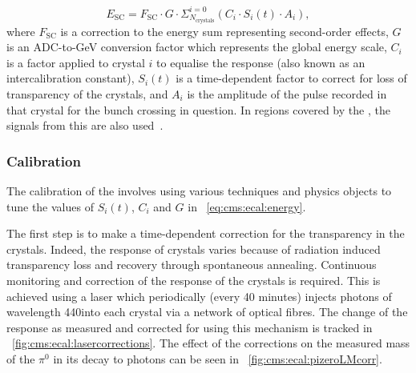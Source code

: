 \begin{equation} 
\label{eq:cms:ecal:energy}
E_{\text{SC}} = F_{\text{SC}} \cdot G \cdot \Sigma^{i=0}_{N_\text{crystals}} ( C_{i} \cdot S_{i}(t) \cdot A_{i}) ,
\end{equation}
where $F_{\text{SC}}$ is a correction to the \SC energy sum representing second-order effects, $G$ is an ADC-to-GeV conversion factor which represents the global energy scale, $C_{i}$ is a factor applied to crystal $i$ to equalise the response (also known as an intercalibration constant), $S_{i}(t)$ is a time-dependent factor to correct for loss of transparency of the crystals, and $A_{i}$ is the amplitude of the pulse recorded in that crystal for the bunch crossing in question. In regions covered by the \ES, the signals from this \subdetector are also used~\cite{cmsEcalCalibration}.


\subsubsection{Calibration}
\label{sec:cms:ecal:calibration}

The calibration of the \ECAL involves using various techniques and physics objects to tune the values of $S_{i}(t)$, $C_{i}$ and $G$ in \Eq~\ref{eq:cms:ecal:energy}. 

The first step is to make a time-dependent correction for the transparency in the crystals. Indeed, the response of \ECAL crystals varies because of radiation induced transparency loss and recovery through spontaneous annealing. Continuous monitoring and correction of the response of the crystals is required. This is achieved using a laser which periodically (every 40 minutes) injects photons of wavelength 440\nm into each crystal via a network of optical fibres. The change of the response as measured and corrected for using this mechanism is tracked in \Fig~\ref{fig:cms:ecal:lasercorrections}. The effect of the corrections on the measured mass of the $\pi^0$ in its decay to photons can be seen in \Fig~\ref{fig:cms:ecal:pizeroLMcorr}.

